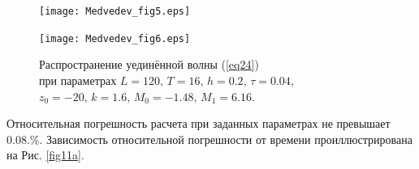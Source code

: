 \documentclass[12pt,a4paper]{article}
\begin{document}
	\begin{figure}[H]
		\begin{center}
			\begin{minipage}[h]{0.48\linewidth} %
				\texttt{[image: Medvedev\_fig5.eps]}
				\label{fig10a}
			\end{minipage}
			\hfill
			\begin{minipage}[h]{0.48\linewidth}
				\texttt{[image: Medvedev\_fig6.eps]}
				\label{fig10b}
			\end{minipage}
		\end{center}
		\caption{Распространение уединённой волны (\ref{eq24}) \\
		при параметрах
		\(L=120,\, T=16,\, h=0.2,\, \tau=0.04\), 
		\(z_{0}=-20,\,k=1.6,\, M_{0}=-1.48,\, M_{1}=6.16\).}
		\label{fig10}
	\end{figure}
	Относительная погрешность расчета при заданных параметрах не превышает 0.08.\%. Зависимость относительной погрешности от времени проиллюстрирована на Рис. \ref{fig11a}.
\end{document}
